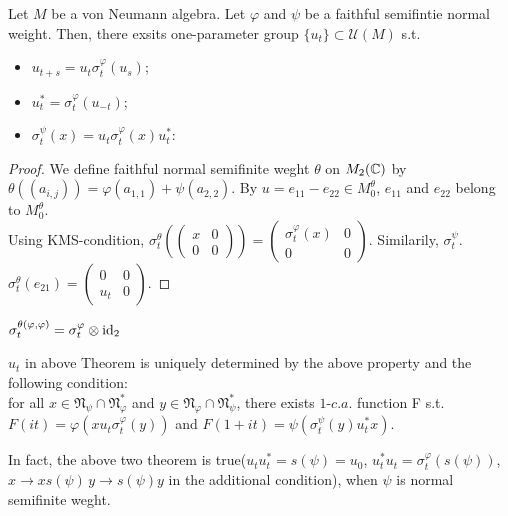 \begin{theorem}[A.Connes]
  Let $M$ be a von Neumann algebra.
  Let $\varphi$ and $\psi$ be a faithful semifintie normal weight.
  Then, there exsits one-parameter group $\{u_t\} \subset \mathcal{U}(M)$ s.t.
    \begin{itemize}
      \item $u_{t+s} = u_t \sigma_t^{\varphi}(u_s)$;
      \item $u_t^* = \sigma_t^{\varphi} (u_{-t})$;
      \item $\sigma_t^\psi(x) = u_t \sigma_t^{\varphi}(x) u_t^*$:
    \end{itemize}
\end{theorem}

\begin{proof}
  We define faithful normal semifinite weght $\theta$ on $M_2(\mathbb{C})$ by $\theta((a_{i,j})) = \varphi(a_{1,1}) + \psi(a_{2,2})$.
  By $u = e_{11}-e_{22} \in M_0^\theta$, $e_{11}$ and $e_{22}$ belong to $M_0^\theta$. \\
  Using KMS-condition, $\sigma_t^\theta(\begin{pmatrix} x & 0 \\ 0 & 0 \end{pmatrix})= \begin{pmatrix} \sigma_t^\varphi(x) & 0 \\ 0 & 0 \end{pmatrix}$.
  Similarily, $\sigma_t^\psi$. \\
  $\sigma_t^\theta(e_{21}) = \begin{pmatrix} 0 & 0 \\ u_t & 0 \end{pmatrix}$.
\end{proof}

\begin{remark}
  $\sigma_t^{\theta(\varphi,\varphi)} = \sigma_t^\varphi \otimes {\rm id}_2$
\end{remark}

\begin{theorem}
  $u_t$ in above Theorem is uniquely determined by the above property and the following condition: \\
  for all $x \in \mathfrak{N}_\psi \cap \mathfrak{N}_\varphi^*$ and $y \in \mathfrak{N}_\varphi \cap \mathfrak{N}_\psi^*$, there exists $1$-$c.a.$ function F s.t. $F(it) = \varphi(x u_t \sigma_t^\varphi(y))$ and $F(1+it) = \psi(\sigma_t^\psi(y)u_t^*x)$.
\end{theorem}

In fact, the above two theorem is true($u_tu_t^* = s(\psi) = u_0$, $u_t^*u_t = \sigma_t^\varphi(s(\psi))$, $x \rightarrow xs(\psi) \, y \rightarrow s(\psi)y$ in the additional condition), when $\psi$ is normal semifinite weght.

